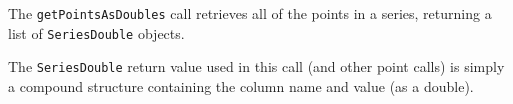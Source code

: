 The \verb+getPointsAsDoubles+ call retrieves all of the points in a series, returning a list of
\verb+SeriesDouble+ objects.

The \verb+SeriesDouble+ return value used in this call (and other point calls) is simply a compound
structure containing the column name and value (as a double).
